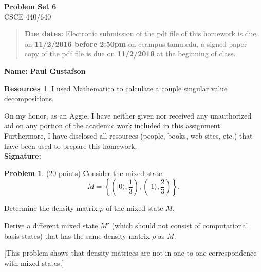 \documentclass{article}
\theoremstyle{definition}
\newtheorem{problem}{Problem}
\newtheorem*{resources}{Resources}
\newcommand{\ket}[1]{|#1\rangle}
\newcommand{\name}[1]{\noindent\textbf{Name: #1}}
\newcommand{\honor}{\noindent On my honor, as an Aggie, I have neither
  given nor received any unauthorized aid on any portion of the
  academic work included in this assignment. Furthermore, I have
  disclosed all resources (people, books, web sites, etc.) that have
  been used to prepare this homework. \\[1ex]
 \textbf{Signature:} \underline{\hspace*{5cm}} }
\newcommand{\problemset}[1]{\begin{center}\textbf{Problem Set #1}\\ 
CSCE 440/640\end{center}}
\newcommand{\duedate}[2]{\begin{quote}\textbf{Due dates:} Electronic
    submission of the pdf file of this homework is due on \textbf{#1} on ecampus.tamu.edu, a signed paper copy
    of the pdf file is due on \textbf{#2} at the beginning of
    class. \end{quote} }
\begin{document}
\problemset{6}
\duedate{11/2/2016 before 2:50pm}{11/2/2016}
\name{ Paul Gustafson }
\begin{resources} 
I used Mathematica to calculate a couple singular value decompositions.
\end{resources}
\honor

\newpage

\noindent 
\begin{problem}{(20 points)}
Consider the mixed state 
$$ M= \left\{ \left(\ket{0}, \frac{1}{3}\right), \left(\ket{1}, \frac{2}{3}\right)\right\}.$$
\begin{compactenum}[(a)]
\item Determine the density matrix $\rho$ of the mixed state $M$. 
\item Derive a different mixed state $M'$ (which should not consist of
  computational basis states) that has the same density matrix
  $\rho$ as $M$. 
\end{compactenum}
[This problem shows that density matrices are not in one-to-one
correspondence with mixed states.]
\end{problem}
\end{document}
